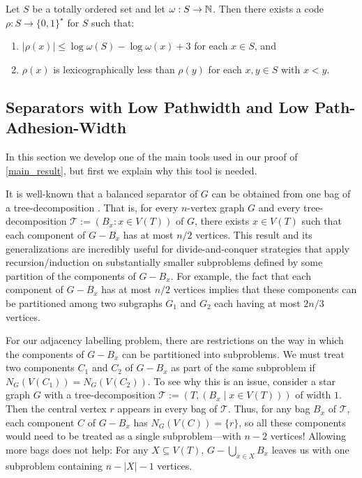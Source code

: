 \documentclass{patmorin}
\renewcommand{\le}{\leqslant}
\begin{document}
  \begin{cor}\label{shannon_fano_elias_code}\label{shannon_fano_elias_cor}
    Let $S$ be a totally ordered set and let $\omega:S\to\mathbb{N}$.  Then there exists a code $\rho:S\to \{0,1\}^\star$ for $S$ such that:
    \begin{enumerate}[nosep,nolistsep,label=(\alph*)]
      \item $|\rho(x)|\le \log\omega(S) - \log\omega(x)+3$ for each $x\in S$, and
      \item $\rho(x)$ is lexicographically less than $\rho(y)$ for each $x,y\in S$ with $x< y$.
    \end{enumerate}
  \end{cor}



  \subsection{Separators with Low Pathwidth and Low Path-Adhesion-Width}

  In this section we develop one of the main tools used in our proof of \cref{main_result}, but first we explain why this tool is needed.

  It is well-known that a balanced separator of $G$ can be obtained from one bag of a tree-decomposition \cite{robertson.seymour:graph_minors_ii}. That is, for every $n$-vertex graph $G$ and every tree-decomposition $\mathcal{T}:=(B_x:x\in V(T))$ of $G$, there exists $x\in V(T)$ such that each component of $G-B_x$ has at most $n/2$ vertices.  This result and its generalizations are incredibly useful for divide-and-conquer strategies that apply recursion/induction on substantially smaller subproblems defined by some partition of the components of $G-B_x$.  For example, the fact that each component of $G-B_x$ has at most $n/2$ vertices implies that these components can be partitioned among two subgraphs $G_1$ and $G_2$ each having at most $2n/3$ vertices.

  For our adjacency labelling problem, there are restrictions on the way in which the components of $G-B_x$ can be partitioned into subproblems. We must treat two components $C_1$ and $C_2$ of $G-B_x$ as part of the same subproblem if $N_G(V(C_1))=N_G(V(C_2))$.  To see why this is an issue, consider a star graph $G$ with a tree-decomposition $\mathcal{T}:=(T,(B_x\mid x\in V(T)))$ of width $1$.  Then the central vertex $r$ appears in every bag of $\mathcal{T}$. Thus, for any bag $B_x$ of $\mathcal{T}$, each component $C$ of $G-B_x$ has $N_G(V(C))=\{r\}$, so all these components would need to be treated as a single subproblem---with $n-2$ vertices!  Allowing more bags does not help:  For any $X\subseteq V(T)$, $G-\bigcup_{x\in X} B_x$ leaves us with one subproblem containing $n-|X|-1$ vertices.
\end{document}
